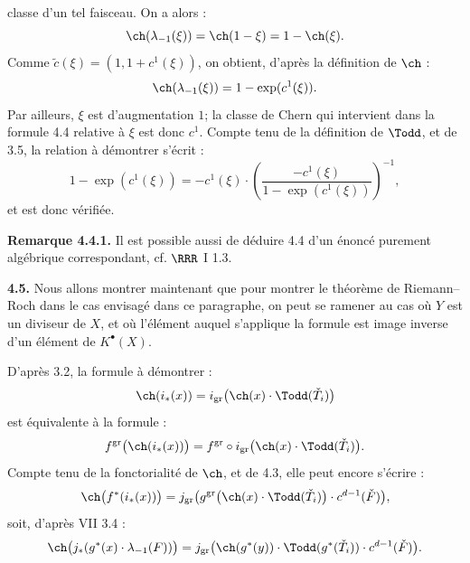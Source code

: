classe d'un tel faisceau. On a alors :
\[
 \ch(\lambda_{-1}(\xi))=\ch(1-\xi)=1-\ch(\xi).
\]
Comme \(\widetilde c(\xi)=(1,1+c^1(\xi))\), on obtient, d'après la définition de \(\ch\) :
\[
 \ch(\lambda_{-1}(\xi))=1-\exp(c^1(\xi)).
\]
Par ailleurs, \(\xi\) est d'augmentation \(1\); la classe de Chern qui intervient dans la formule 4.4 relative à \(\xi\) est donc \(c^1\). Compte tenu de la définition de \(\Todd\), et de 3.5, la relation à démontrer s'écrit :
\[
 1-\exp(c^1(\xi))
 =
 -c^1(\xi)\cdot\left(\frac{-c^1(\xi)}{1-\exp(c^1(\xi))}\right)^{-1},
\]
et est donc vérifiée.

\textbf{Remarque 4.4.1.} Il est possible aussi de déduire 4.4 d'un énoncé purement algébrique correspondant, cf. \(\RRR\) I 1.3.

\textbf{4.5.} Nous allons montrer maintenant que pour montrer le théorème de Riemann--Roch dans le cas envisagé dans ce paragraphe, on peut se ramener au cas où \(Y\) est un diviseur de \(X\), et où l'élément auquel s'applique la formule est image inverse d'un élément de \(K^{\bullet}(X)\).

D'après 3.2, la formule à démontrer :
\[
 \ch(i_*(x))=
 i_{\mathrm{gr}}\bigl(\ch(x)\cdot\Todd(\check T_i)\bigr)
\]
est équivalente à la formule :
\[
 f^{\mathrm{gr}}\bigl(\ch(i_*(x))\bigr)
 =
 f^{\mathrm{gr}}\circ i_{\mathrm{gr}}\bigl(\ch(x)\cdot\Todd(\check T_i)\bigr).
\]
Compte tenu de la fonctorialité de \(\ch\), et de 4.3, elle peut encore s'écrire :
\[
 \ch\bigl(f^*(i_*(x))\bigr)
 =
 j_{\mathrm{gr}}\bigl(g^{\mathrm{gr}}\bigl(\ch(x)\cdot\Todd(\check T_i)\bigr)\cdot c^{d-1}(\check F)\bigr),
\]
soit, d'après VII 3.4 :
\[
 \ch\bigl(j_*(g^*(x)\cdot\lambda_{-1}(F))\bigr)
 =
 j_{\mathrm{gr}}\bigl(\ch(g^*(y))\cdot\Todd(g^*(\check T_i))\cdot c^{d-1}(\check F)\bigr).
\]

